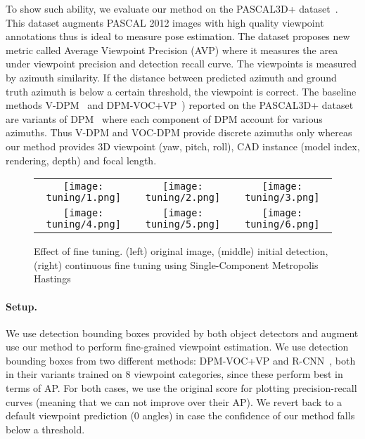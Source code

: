 To show such ability, we evaluate our method on the PASCAL3D+
dataset~\cite{Xiang14}. This dataset augments PASCAL 2012 images with
high quality viewpoint annotations thus is ideal to measure pose
estimation. The dataset proposes new metric called Average Viewpoint
Precision (AVP) where it measures the area under viewpoint precision
and detection recall curve. The viewpoints is measured by azimuth
similarity. If the distance between predicted azimuth and ground truth
azimuth is below a certain threshold, the viewpoint is correct.
The baseline methods V-DPM~\cite{Xiang14} and
DPM-VOC+VP~\cite{Pepik12}) reported on the PASCAL3D+ dataset are
variants of DPM~\cite{Felzenszwalb10} where each component of DPM
account for various azimuths. Thus V-DPM and VOC-DPM provide discrete
azimuths only whereas our method provides 3D viewpoint (yaw, pitch,
roll), CAD instance (model index, rendering, depth) and focal length.
%
\begin{figure}[t]
 \begin{center}
    \setlength\tabcolsep{0pt}
    \begin{tabular}{ccc}
   \texttt{[image: tuning/1.png]} &
   \texttt{[image: tuning/2.png]} &
   \texttt{[image: tuning/3.png]} \\[-5pt]
   \texttt{[image: tuning/4.png]} &
   \texttt{[image: tuning/5.png]} &
   \texttt{[image: tuning/6.png]} \\[-5pt]
   \end{tabular}
 \end{center}
 \caption{Effect of fine tuning. (left) original image, (middle) initial detection, (right) continuous fine tuning using Single-Component Metropolis Hastings}
 \label{fig:tuning}
\end{figure}

\paragraph{Setup.}
We use detection bounding boxes provided by both object detectors and
augment use our method to perform fine-grained viewpoint estimation. We use
detection bounding boxes from two different methods:
DPM-VOC+VP\cite{Pepik12} and R-CNN~\cite{Girshick14}, both in their
variants trained on 8 viewpoint categories, since these perform best
in terms of AP. For both cases,
we use the original score for plotting precision-recall curves
(meaning that we can not improve over their AP). We revert back to a default
viewpoint prediction ($0$ angles) in case the confidence of our
method falls below a threshold.

